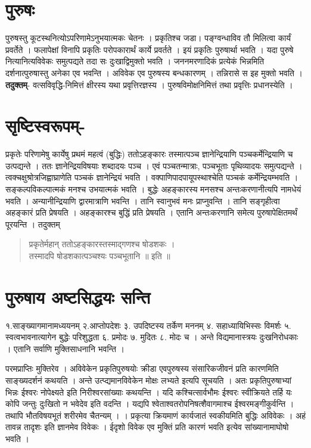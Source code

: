 {\section*{पुरुषः}

पुरुषस्तु कूटस्थनित्योऽपरिणामेऽनुभयात्मकः चेतनः । प्रकृतिश्च जडा। पङ्ग्वन्धाविव तौ मिलित्वा कार्यं प्रवर्तेते । फलापेक्षां विनापि प्रकृतिः परोपकारार्थं कार्ये प्रवर्तते । इयं प्रकृतिः पुरुषार्था भवति । यदा पुरुषे नित्यानित्यविवेकः समुत्पद्यते तदा सः दुःखाद्विमुक्तो भवति । जननमरणादिकं प्रत्येकं भिन्नमिति दर्शनात्पुरुषास्तु अनेका एव भवन्ति । अविवेक एव पुरुषस्य बन्धकारणम् । तन्निरासे स इह मुक्तो भवति । \textbf{तदुक्तम्}- वत्सविवृद्धि-निमित्तं क्षीरस्य यथा प्रवृत्तिरज्ञस्य । पुरुषविमोक्षनिमित्तं तथा प्रवृत्तिः प्रधानस्येति ।

\section*{सृष्टिस्वरूपम्-} 

प्रकृतेः परिणामेषु कार्येषु प्रथमं महत्वं (बुद्धिः)  ततोऽहङ्कारः  तस्मात्पञ्च ज्ञानेन्द्रियाणि पञ्चकर्मेन्द्रियाणि च उत्पद्यन्ते । ततः ज्ञानेन्द्रियविषयाः शब्दादयः पञ्च । एवं पञ्चतन्मात्राः, पञ्चभूताः पृथिव्यादयः समुत्पद्यन्ते । त्वक्चक्षुश्रोत्रजिह्वाघ्राणेति पञ्चकं ज्ञानेन्द्रियं भवति । वक्पाणिपादपायूपस्थाश्चेति पञ्चकं कर्मेन्द्रियम्भवति । सङ्कल्पविकल्पात्मकं मनश्च उभयात्मकं भवति । बुद्धेः अहङ्कारस्य मनसश्च अन्तःकरणानीत्यपि नामधेयं भवति । अन्यानीन्द्रियाणि द्वारमात्राणि भवन्ति । तानि स्वानुभवं मनः प्राप्नुवन्ति । तानि सङ्गृहीत्वा अहङ्कारं प्रति प्रेषयति । अहङ्कारश्च बुद्धिं प्रति प्रेषयति । एतानि अन्तःकरणानि समेत्य पुरुषापेक्षितमर्थं पूरयन्ति । तदुक्तम् 
\begin{verse}
प्रकृतेर्महान् ततोऽहङ्कारस्तस्माद्गणश्च षोडशकः ।\\
तस्मादपि षोडशकात्पञ्चश्यः पञ्चभूतानि ॥ इति ॥
\end{verse}

\section*{पुरुषाय अष्टसिद्धयः सन्ति}

१.साङ्ख्यागमानामध्ययनम् 	२.आप्तोपदेशः ३.  उपदिष्टस्य तर्केण मननम्
४. सहाध्यायिभिस्सः विमर्शः 	५. स्वत्वभावनात्यागेन बुद्धेः परिशुद्धता	६. प्रमोदः
७. मुदितः	८. मोदः च । अन्ते विद्यमानास्त्रयः दुःखनिरोधकाः । एतानि सर्वाणि मुक्तिसाधनानि भवन्ति ।

परमप्राप्तिः मुक्तिरेव । अविवेकेन प्रकृतिपुरुषयोः क्रीडा एवपुरुषस्य संसारिकजीवनं प्रति कारणमिति साङ्ख्यदर्शनं कथयति । अन्ते उत्प्द्यमानविवेकेन मोक्षः लभ्यते इत्यपि सूचयति । अतः प्रकृतिपुरुषाभ्यां भिन्नः ईश्वरः नोपेक्ष्यते इति निरीश्वरसांख्याः कथयन्ति । यदि कश्चित्सार्वभौमः ईश्वरः स्वीक्रियते तर्हि यः कोपि जन्तुः दुःखितो न भवेदेव इति वदन्ति । यद्यपि श्वेताश्वतरोपनिषत्शैवागमाश्च ईश्वरमङ्गीकुर्वन्ति । तथापि भौतविषयभूतं शरीरमेव चैतन्यम् । । प्रकृत्या क्रियमाणं कार्यजातं स्वकीयमिति बुद्धिः अविवेकः । अहं तावन्न तादृशः इति ज्ञानमेव विवेकः । ईदृशो विवेक एव मुक्तिं प्रति कारणं भवति इत्येव सांख्यानामाघोषो भवति ।

\articleend
}
